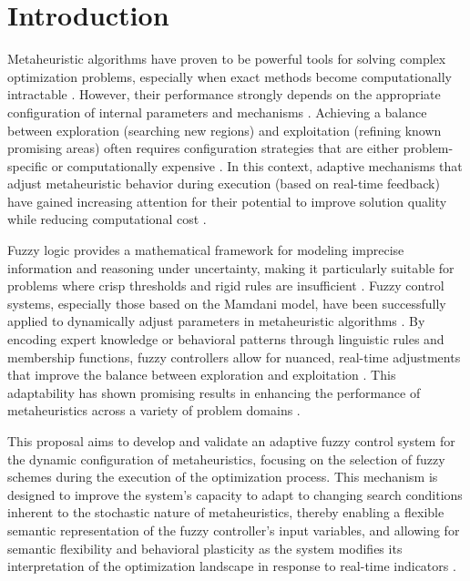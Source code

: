 \chapter{Introduction} \label{chapter:intro}

Metaheuristic algorithms have proven to be powerful tools for solving complex optimization problems, especially when exact methods become computationally intractable \parencite{duan2023applications, agung2021performance, jaber2024review}. However, their performance strongly depends on the appropriate configuration of internal parameters and mechanisms \parencite{hamadi2010autonomous, dorigo1996ant, kennedy1995particle}. Achieving a balance between exploration (searching new regions) and exploitation (refining known promising areas) often requires configuration strategies that are either problem-specific or computationally expensive \parencite{huang2019survey, caceres2017experimental}. In this context, adaptive mechanisms that adjust metaheuristic behavior during execution (based on real-time feedback) have gained increasing attention for their potential to improve solution quality while reducing computational cost \parencite{lin2020can, eftimov2020dsctool}.

Fuzzy logic provides a mathematical framework for modeling imprecise information and reasoning under uncertainty, making it particularly suitable for problems where crisp thresholds and rigid rules are insufficient \parencite{zadeh1983role, zadeh1992knowledge}. Fuzzy control systems, especially those based on the Mamdani model, have been successfully applied to dynamically adjust parameters in metaheuristic algorithms \parencite{valdez2014survey, diaz2017new}. By encoding expert knowledge or behavioral patterns through linguistic rules and membership functions, fuzzy controllers allow for nuanced, real-time adjustments that improve the balance between exploration and exploitation \parencite{valdez2010fuzzy, sadollah2018introductory}. This adaptability has shown promising results in enhancing the performance of metaheuristics across a variety of problem domains \parencite{valdez2014survey, sadollah2018introductory}.

This proposal aims to develop and validate an adaptive fuzzy control system for the dynamic configuration of metaheuristics, focusing on the selection of fuzzy schemes during the execution of the optimization process. This mechanism is designed to improve the system's capacity to adapt to changing search conditions inherent to the stochastic nature of metaheuristics, thereby enabling a flexible semantic representation of the fuzzy controller’s input variables, and allowing for semantic flexibility and behavioral plasticity as the system modifies its interpretation of the optimization landscape in response to real-time indicators \parencite{valdez2014survey, dombi2021modifiers}.

